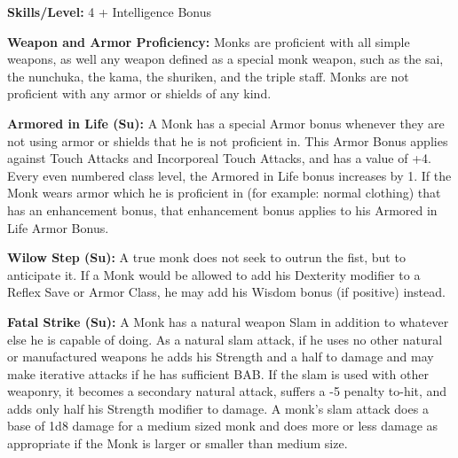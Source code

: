 \textbf{Skills/Level:} 4 + Intelligence Bonus

\goodbab{}
\goodfor{}
\goodref{}
\goodwil{}

\begin{classtable}
\end{classtable}

\classfeatures

\textbf{Weapon and Armor Proficiency:} Monks are proficient with all simple weapons, as well any weapon defined as a special monk weapon, such as the sai, the nunchuka, the kama, the shuriken, and the triple staff. Monks are not proficient with any armor or shields of any kind.

\textbf{Armored in Life (Su):} A Monk has a special Armor bonus whenever they are not using armor or shields that he is not proficient in. This Armor Bonus applies against Touch Attacks and Incorporeal Touch Attacks, and has a value of +4. Every even numbered class level, the Armored in Life bonus increases by 1. If the Monk wears armor which he is proficient in (for example: normal clothing) that has an enhancement bonus, that enhancement bonus applies to his Armored in Life Armor Bonus.

\textbf{Wilow Step (Su):} A true monk does not seek to outrun the fist, but to anticipate it. If a Monk would be allowed to add his Dexterity modifier to a Reflex Save or Armor Class, he may add his Wisdom bonus (if positive) instead.

\textbf{Fatal Strike (Su):} A Monk has a natural weapon Slam in addition to whatever else he is capable of doing. As a natural slam attack, if he uses no other natural or manufactured weapons he adds his Strength and a half to damage and may make iterative attacks if he has sufficient BAB. If the slam is used with other weaponry, it becomes a secondary natural attack, suffers a -5 penalty to-hit, and adds only half his Strength modifier to damage. A monk's slam attack does a base of 1d8 damage for a medium sized monk and does more or less damage as appropriate if the Monk is larger or smaller than medium size.

